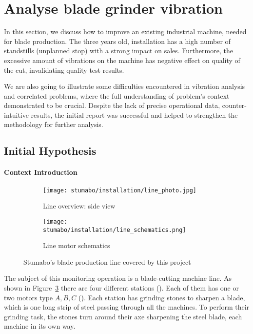 \section{Analyse blade grinder vibration}
In this section, we discuss how to improve an existing industrial machine, needed for blade production.
The three years old, installation has a high number of standstills (unplanned stop) with a strong impact on sales.
Furthermore, the excessive amount of vibrations on the machine has negative effect on quality of the cut, invalidating quality test results.

We are also going to illustrate some difficulties encountered in vibration analysis and correlated problems, where 
the full understanding of problem's context demonstrated to be crucial.
Despite the lack of precise operational data, counter-intuitive results, the initial report was successful and helped to strengthen the methodology for further analysis.

\subsection{Initial Hypothesis}
\paragraph{Context Introduction}
\begin{figure}[ht]
    \begin{subfigure}{\textwidth}
        \texttt{[image: stumabo/installation/line\_photo.jpg]}
        \caption{Line overview: side view}
        \label{fig:line_overview}
    \end{subfigure}
    \begin{subfigure}{\textwidth}
        \texttt{[image: stumabo/installation/line\_schematics.png]}
        \caption{Line motor schematics}
        \label{fig:line_schematics}
    \end{subfigure}
    \caption{Stumabo's blade production line covered by this project}
    \label{fig:stumabo_prod_line}
\end{figure}
The subject of this monitoring operation is a blade-cutting machine line.
As shown in Figure~\ref{fig:stumabo_prod_line} there are four different stations (). Each of them has one or two motors type ${A,B,C}$ ().
Each station has grinding stones to sharpen a blade, which is one long strip of steel passing through all the machines.
To perform their grinding task, the stones turn around their axe sharpening the steel blade, each machine in its own way.

